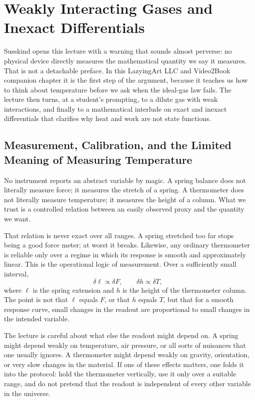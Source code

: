 \chapter{Weakly Interacting Gases and Inexact Differentials}

Susskind opens this lecture with a warning that sounds almost perverse: no physical device directly measures the mathematical quantity we say it measures. That is not a detachable preface. In this LazyingArt LLC and Video2Book companion chapter it is the first step of the argument, because it teaches us how to think about temperature before we ask when the ideal-gas law fails. The lecture then turns, at a student's prompting, to a dilute gas with weak interactions, and finally to a mathematical interlude on exact and inexact differentials that clarifies why heat and work are not state functions.

\section{Measurement, Calibration, and the Limited Meaning of Measuring Temperature}

No instrument reports an abstract variable by magic. A spring balance does not literally measure force; it measures the stretch of a spring. A thermometer does not literally measure temperature; it measures the height of a column. What we trust is a controlled relation between an easily observed proxy and the quantity we want.

That relation is never exact over all ranges. A spring stretched too far stops being a good force meter; at worst it breaks. Likewise, any ordinary thermometer is reliable only over a regime in which its response is smooth and approximately linear. This is the operational logic of measurement. Over a sufficiently small interval,
\begin{equation}
\delta \ell \propto \delta F,
\qquad
\delta h \propto \delta T,
\end{equation}
where \(\ell\) is the spring extension and \(h\) is the height of the thermometer column. The point is not that \(\ell\) equals \(F\), or that \(h\) equals \(T\), but that for a smooth response curve, small changes in the readout are proportional to small changes in the intended variable.

The lecture is careful about what else the readout might depend on. A spring might depend weakly on temperature, air pressure, or all sorts of nuisances that one usually ignores. A thermometer might depend weakly on gravity, orientation, or very slow changes in the material. If one of these effects matters, one folds it into the protocol: hold the thermometer vertically, use it only over a suitable range, and do not pretend that the readout is independent of every other variable in the universe.

